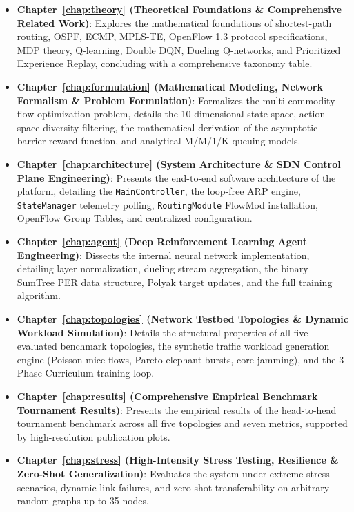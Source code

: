 \documentclass[12pt,a4paper,oneside]{report}
\begin{document}
\begin{itemize}
    \item \textbf{Chapter~\ref{chap:theory} (Theoretical Foundations \& Comprehensive Related Work)}: Explores the mathematical foundations of shortest-path routing, OSPF, ECMP, MPLS-TE, OpenFlow 1.3 protocol specifications, MDP theory, Q-learning, Double DQN, Dueling Q-networks, and Prioritized Experience Replay, concluding with a comprehensive taxonomy table.
    \item \textbf{Chapter~\ref{chap:formulation} (Mathematical Modeling, Network Formalism \& Problem Formulation)}: Formalizes the multi-commodity flow optimization problem, details the 10-dimensional state space, action space diversity filtering, the mathematical derivation of the asymptotic barrier reward function, and analytical M/M/1/K queuing models.
    \item \textbf{Chapter~\ref{chap:architecture} (System Architecture \& SDN Control Plane Engineering)}: Presents the end-to-end software architecture of the platform, detailing the \texttt{MainController}, the loop-free ARP engine, \texttt{StateManager} telemetry polling, \texttt{RoutingModule} FlowMod installation, OpenFlow Group Tables, and centralized configuration.
    \item \textbf{Chapter~\ref{chap:agent} (Deep Reinforcement Learning Agent Engineering)}: Dissects the internal neural network implementation, detailing layer normalization, dueling stream aggregation, the binary SumTree PER data structure, Polyak target updates, and the full training algorithm.
    \item \textbf{Chapter~\ref{chap:topologies} (Network Testbed Topologies \& Dynamic Workload Simulation)}: Details the structural properties of all five evaluated benchmark topologies, the synthetic traffic workload generation engine (Poisson mice flows, Pareto elephant bursts, core jamming), and the 3-Phase Curriculum training loop.
    \item \textbf{Chapter~\ref{chap:results} (Comprehensive Empirical Benchmark Tournament Results)}: Presents the empirical results of the head-to-head tournament benchmark across all five topologies and seven metrics, supported by high-resolution publication plots.
    \item \textbf{Chapter~\ref{chap:stress} (High-Intensity Stress Testing, Resilience \& Zero-Shot Generalization)}: Evaluates the system under extreme stress scenarios, dynamic link failures, and zero-shot transferability on arbitrary random graphs up to 35 nodes.

\end{itemize}
\end{document}
